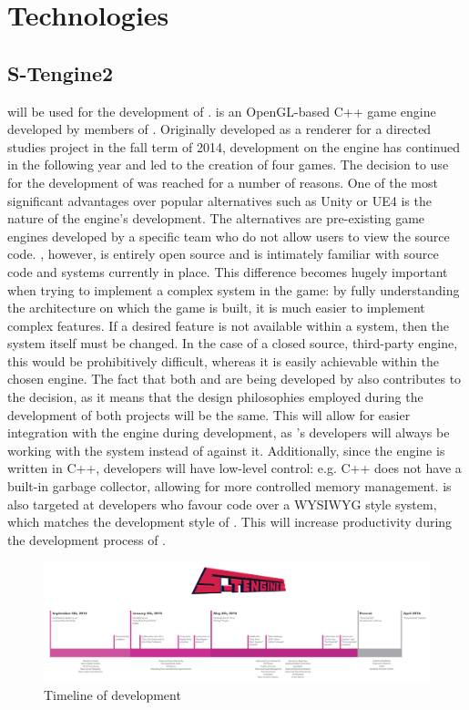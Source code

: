 \clearpage
\section{Technologies}

\subsection{S-Tengine2}
\ourengine{} will be used for the development of \ourgame{}. \ourengine{} is an OpenGL-based C++ game engine developed by members of \ourteam{}. Originally developed as a renderer for a directed studies project in the fall term of 2014, development on the engine has continued in the following year and led to the creation of four games. The decision to use \ourengine{} for the development of \ourgame{} was reached for a number of reasons. One of the most significant advantages over popular alternatives such as Unity or UE4 is the nature of the engine's development. The alternatives are pre-existing game engines developed by a specific team who do not allow users to view the source code. \ourengine{}, however, is entirely open source and \ourteam{} is intimately familiar with source code and systems currently in place. This difference becomes hugely important when trying to implement a complex system in the game: by fully understanding the architecture on which the game is built, it is much easier to implement complex features. If a desired feature is not available within a system, then the system itself must be changed. In the case of a closed source, third-party engine, this would be prohibitively difficult, whereas it is easily achievable within the chosen engine. The fact that both \ourengine{} and \ourgame{} are being developed by \ourteam{} also contributes to the decision, as it means that the design philosophies employed during the development of both projects will be the same. This will allow for easier integration with the engine during development, as \ourteam{}'s developers will always be working with the system instead of against it. Additionally, since the engine is written in C++, developers will have low-level control: e.g. C++ does not have a built-in garbage collector, allowing for more controlled memory management. \ourengine{} is also targeted at developers who favour code over a WYSIWYG style system, which matches the development style of \ourteam{}. This will increase productivity during the development process of \ourgame{}.

\begin{figure}[p]
\includegraphics[width=0.95\linewidth]{images/timeline}
\caption{Timeline of \ourengine{} development}
\end{figure}
